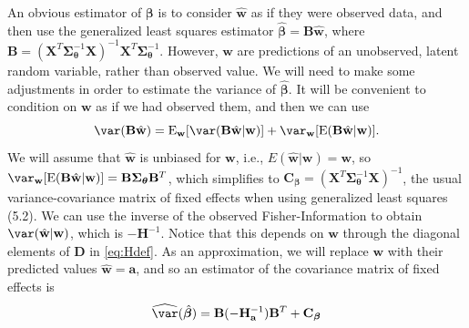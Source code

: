 \documentclass[12pt, titlepage]{article}
\begin{document}
An obvious estimator of $\boldsymbol{\beta}$ is to consider $\hat{\mathbf{w}}$ as if they were observed data, and then use the generalized least squares estimator $\hat{\boldsymbol{\beta}} = \mathbf{B}\hat{\mathbf{w}}$, where $\mathbf{B} = (\mathbf{X}^{T}\boldsymbol{\Sigma}_{\boldsymbol{\theta}}^{-1}\mathbf{X})^{-1}\mathbf{X}^{T}\boldsymbol{\Sigma}_{\boldsymbol{\theta}}^{-1}$.  However, $\mathbf{w}$ are predictions of an unobserved, latent random variable, rather than observed value.  We will need to make some adjustments in order to estimate the variance of $\hat{\boldsymbol{\beta}}$.  It will be convenient to condition on $\mathbf{w}$ as if we had observed them, and then we can use
$$
\var(\mathbf{B}\hat{\mathbf{w}}) = \textrm{E}_{\mathbf{w}}[\var(\mathbf{B}\hat{\mathbf{w}}|\mathbf{w})] + \var_{\mathbf{w}}[\textrm{E}(\mathbf{B}\hat{\mathbf{w}}|\mathbf{w})].
$$
We will assume that $\hat{\mathbf{w}}$ is unbiased for $\mathbf{w}$, i.e., $E(\hat{\mathbf{w}}|\mathbf{w}) = \mathbf{w}$, so $\var_{\mathbf{w}}[\textrm{E}(\mathbf{B}\hat{\mathbf{w}}|\mathbf{w})] = \mathbf{B}\boldsymbol{\Sigma_{\boldsymbol{\theta}}}\mathbf{B}^{T}$, which simplifies to $\mathbf{C}_{\boldsymbol{\beta}} = (\mathbf{X}^{T}\boldsymbol{\Sigma}_{\boldsymbol{\theta}}^{-1}\mathbf{X})^{-1}$, the usual variance-covariance matrix of fixed effects when using generalized least squares (5.2). We can use the inverse of the observed Fisher-Information to obtain $\var(\hat{\mathbf{w}}|\mathbf{w})$, which is $-\mathbf{H}^{-1}$.  Notice that this depends on $\mathbf{w}$ through the diagonal elements of $\mathbf{D}$ in \eqref{eq:Hdef}.  As an approximation, we will replace $\mathbf{w}$ with their predicted values $\hat{\mathbf{w}} = \mathbf{a}$, and so an estimator of the covariance matrix of fixed effects is
\begin{equation} \label{eq:sglmm_varfe}
\widehat{\var}(\hat{\boldsymbol{\beta}}) = \mathbf{B}(-\mathbf{H}_{\mathbf{a}}^{-1})\mathbf{B}^{T} + \mathbf{C}_{\boldsymbol{\beta}}
\end{equation}
\end{document}
